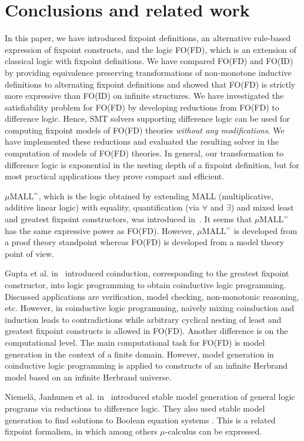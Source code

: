 \documentclass{tlp}
\begin{document}
\section{Conclusions and related work}\label{sec:con}
In this paper, we have introduced fixpoint definitions, an alternative rule-based expression of fixpoint constructs, and the logic FO(FD), which is an extension of classical logic with fixpoint definitions. We have compared FO(FD) and FO(ID) by providing equivalence preserving transformations of non-monotone inductive definitions to alternating fixpoint definitions and showed that FO(FD) is strictly more expressive than FO(ID) on infinite structures. We have investigated the satisfiability problem for FO(FD) by developing reductions from FO(FD) to difference logic. Hence, SMT solvers supporting difference logic can be used for computing fixpoint models of FO(FD) theories {\em without any modifications}. We have implemented these reductions and evaluated the resulting solver in the computation of models of FO(FD) theories. In general, our transformation to difference logic is exponential in the nesting depth of a fixpoint definition, but for most practical applications they prove compact and efficient.

$\mu\text{MALL}^{=}$, which is the logic obtained by extending MALL (multiplicative, additive linear logic) with equality, quantification (via $\forall$ and $\exists$) and mixed least and greatest fixpoint constructors, was introduced in~\cite{lpar/BaeldeM07}. It seems that $\mu\text{MALL}^{=}$ has the same expressive power as FO(FD). However, $\mu\text{MALL}^{=}$ is developed from a proof theory standpoint whereas FO(FD) is developed from a model theory point of view.

Gupta et al. in~\cite{iclp/GuptaBMSM07} introduced coinduction, corresponding to the greatest fixpoint constructor, into logic programming to obtain coinductive logic programming. Discussed applications are  verification, model checking, non-monotonic reasoning, etc. However, in coinductive logic programming, naively mixing coinduction and induction leads to contradictions while arbitrary cyclical nesting of least and greatest fixpoint constructs is allowed in FO(FD). Another difference is on the computational level. The main computational task for FO(FD) is model generation in the context of a finite domain. However, model generation in coinductive logic programming is applied to constructs of an infinite Herbrand model based on an infinite Herbrand universe.

Niemel{\"a}, Janhunen et al. in~\cite{lpnmr/JanhunenNS09,amai/Niemela08} introduced stable model generation of general logic programs via reductions to difference logic. They also used stable model generation to find solutions to Boolean equation systems \cite{wlp/KeinanenN04}. This is a related fixpoint formalism, in which among others $\mu$-calculus can be expressed.
\end{document}
